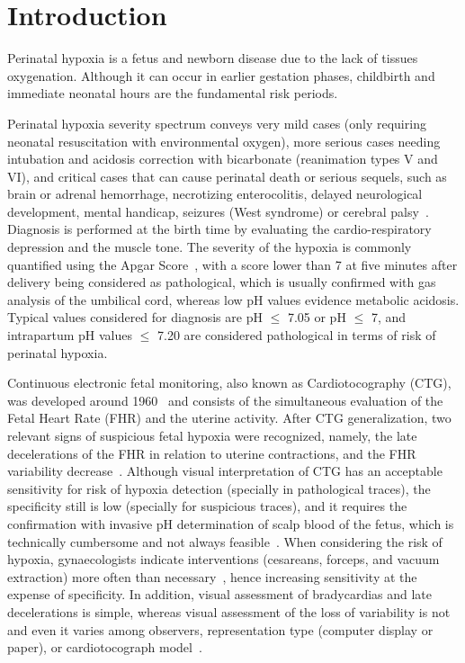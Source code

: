 \section{Introduction}

Perinatal hypoxia is a fetus and newborn disease due to the lack of tissues oxygenation. Although it can occur in earlier gestation phases, childbirth and immediate neonatal hours are the fundamental risk periods.

Perinatal hypoxia severity spectrum conveys very mild cases (only requiring neonatal resuscitation with environmental oxygen), more serious cases needing intubation and acidosis correction with bicarbonate (reanimation types V and VI), and critical cases that can cause perinatal death or serious sequels, such as brain or adrenal hemorrhage, necrotizing enterocolitis, delayed neurological development, mental handicap, seizures (West syndrome) or cerebral palsy~\cite{Leuthner2004,Morales2011}. Diagnosis is performed at the birth time by evaluating the cardio-respiratory depression and the muscle tone. The severity of the hypoxia is commonly quantified using the Apgar Score~\cite{Apgar1953,casey2001continuing}, with a score lower than 7 at five minutes after delivery being considered as pathological, which is  usually confirmed with gas analysis of the umbilical cord, whereas low pH values  evidence  metabolic acidosis. Typical values considered for diagnosis are pH $\leq$ 7.05 or pH $\leq$ 7, and intrapartum pH values $\leq$  7.20  are considered pathological in terms of risk of perinatal hypoxia.

Continuous electronic fetal monitoring, also known as Cardiotocography (CTG), was developed around 1960~\cite{Hon1958,Hammacher1968} and consists of the simultaneous evaluation of the Fetal Heart Rate (FHR) and the uterine activity.  After CTG generalization, two relevant signs of suspicious fetal hypoxia were recognized, namely, the late decelerations of the FHR in relation to uterine contractions, and the FHR variability decrease~\cite{Low1999}. Although visual interpretation of CTG has an acceptable sensitivity for  risk of hypoxia detection (specially in pathological traces), the specificity still is low (specially for suspicious traces), and it requires the confirmation with invasive pH determination of scalp blood of the fetus, which is technically cumbersome and not always feasible~\cite{Tasnim2009}. When considering the risk of hypoxia, gynaecologists indicate interventions (cesareans, forceps, and vacuum extraction) more often than necessary~\cite{Tasnim2009}, hence increasing sensitivity at the expense of specificity. In addition, visual assessment of bradycardias and late decelerations is simple, whereas visual assessment of the loss of variability is not and even it varies among observers, representation type (computer display or paper), or cardiotocograph model~\cite{Ayres-de-Campos1999,Bernardes1997,Santo2012}.

